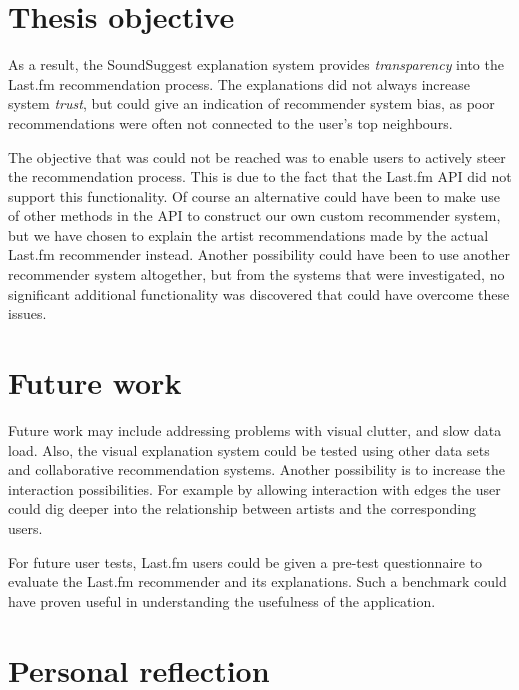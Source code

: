 \section{Thesis objective}

As a result, the SoundSuggest explanation system provides \emph{transparency} into the Last.fm recommendation process. The explanations did not always increase system \emph{trust}, but could give an indication of recommender system bias, as poor recommendations were often not connected to the user's top neighbours.

The objective that was could not be reached was to enable users to actively steer the recommendation process. This is due to the fact that the Last.fm API did not support this functionality. Of course an alternative could have been to make use of other methods in the API to construct our own custom recommender system, but we have chosen to explain the artist recommendations made by the actual Last.fm recommender instead. Another possibility could have been to use another recommender system altogether, but from the systems that were investigated, no significant additional functionality was discovered that could have overcome these issues.


\section{Future work}

Future work may include addressing problems with visual clutter, and slow data load. Also, the visual explanation system could be tested using other data sets and collaborative recommendation systems. Another possibility is to increase the interaction possibilities. For example by allowing interaction with edges the user could dig deeper into the relationship between artists and the corresponding users.

For future user tests, Last.fm users could be given a pre-test questionnaire to evaluate the Last.fm recommender and its explanations. Such a benchmark could have proven useful in understanding the usefulness of the application.


\section{Personal reflection}






